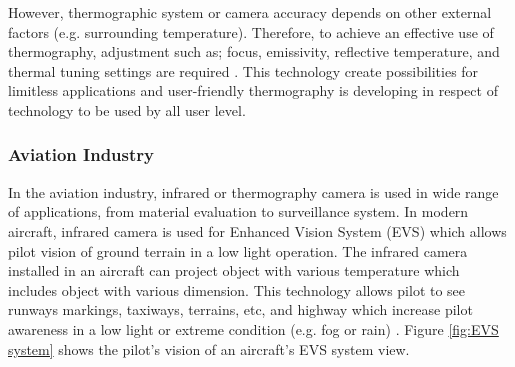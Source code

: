 \noindent However, thermographic system or camera accuracy depends on other external factors (e.g. surrounding temperature). Therefore, to achieve an effective use of thermography, adjustment such as; focus, emissivity, reflective temperature, and thermal tuning settings are required \cite{TroutInfraredPlant}. This technology create possibilities for limitless applications and user-friendly thermography is developing in respect of technology to be used by all user level.\\

\subsubsection{Aviation Industry}
In the aviation industry, infrared or thermography camera is used in wide range of applications, from material evaluation to surveillance system. In modern aircraft, infrared camera is used for Enhanced Vision System (EVS) which allows pilot vision of ground terrain in a low light operation. The infrared camera installed in an aircraft can project object with various temperature which includes object with various dimension. This technology allows pilot to see runways markings, taxiways, terrains, etc, and highway which increase pilot awareness in a low light or extreme condition (e.g. fog or rain) \cite{Stumper2015ThermalAviation}. Figure \ref{fig:EVS system} shows the pilot's vision of an aircraft's EVS system view.  \\

